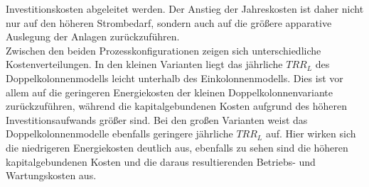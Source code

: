 Investitionskosten abgeleitet werden. Der Anstieg der Jahreskosten ist daher nicht nur auf den höheren Strombedarf, sondern auch auf die größere apparative Auslegung der Anlagen zurückzuführen.\\
Zwischen den beiden Prozesskonfigurationen zeigen sich unterschiedliche Kostenverteilungen. In den kleinen Varianten liegt das jährliche \(TRR_L\) des
Doppelkolonnenmodells leicht unterhalb des Einkolonnenmodells. Dies ist vor allem auf die geringeren Energiekosten der kleinen Doppelkolonnenvariante zurückzuführen, während die kapitalgebundenen Kosten aufgrund des höheren Investitionsaufwands
größer sind. Bei den großen Varianten weist das Doppelkolonnenmodelle ebenfalls geringere
 jährliche \(TRR_L\) auf. Hier wirken sich die niedrigeren Energiekosten deutlich aus, ebenfalls zu sehen sind die höheren kapitalgebundenen Kosten und die daraus resultierenden Betriebs- und Wartungskosten aus.\\

